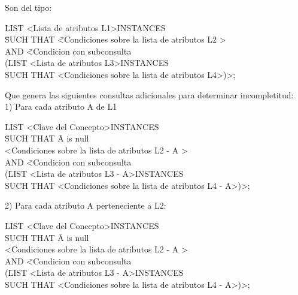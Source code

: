 Son del tipo: 

\begin{tabbing}	
\= LIST \textless Lista de atributos L1\textgreater INSTANCES \\
\= SUCH THAT \= \textless Condiciones sobre la lista de atributos L2 \textgreater \\
\> \> AND \= \textless Condicion con subconsulta \\
\> \> \> (\= LIST \textless Lista de atributos L3\textgreater INSTANCES \\
\> \> \> \> SUCH THAT \textless Condiciones sobre la lista de atributos L4\textgreater)\textgreater ;\\
\end{tabbing}

	Que genera las siguientes consultas adicionales para determinar incompletitud:\\

1) Para cada atributo A de L1

\begin{tabbing}	
\= LIST \textless Clave del Concepto\textgreater INSTANCES \\
\= SUCH THAT \= A is null \\
\> \> \textless Condiciones sobre la lista de atributos L2 - A \textgreater \\
\> \> AND \= \textless Condicion con subconsulta \\
\> \> \> (\= LIST \textless Lista de atributos L3 - A\textgreater INSTANCES \\
\> \> \> \> SUCH THAT \textless Condiciones sobre la lista de atributos L4 - A\textgreater)\textgreater ;\\
\end{tabbing}

2)  Para cada atributo A perteneciente a L2: 

\begin{tabbing}
	
\= LIST \textless Clave del Concepto\textgreater INSTANCES \\
\= SUCH THAT \= A is null \\
\> \> \textless Condiciones sobre la lista de atributos L2 - A \textgreater \\
\> \> AND \= \textless Condicion con subconsulta \\
\> \> \> (\= LIST \textless Lista de atributos L3 - A\textgreater INSTANCES \\
\> \> \> \> SUCH THAT \textless Condiciones sobre la lista de atributos L4 - A\textgreater)\textgreater ;\\
\end{tabbing}


